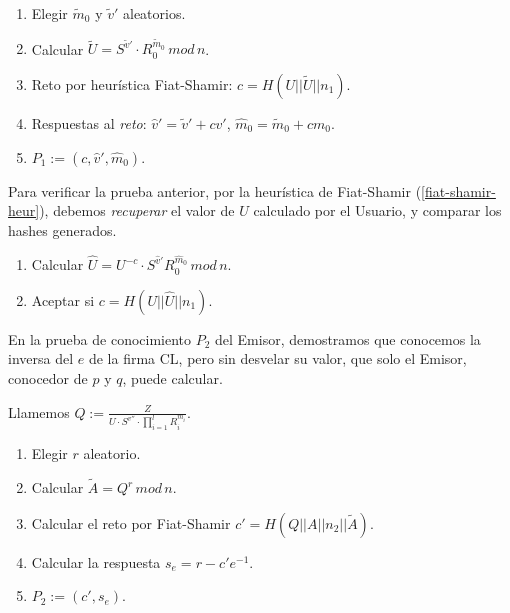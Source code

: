 \begin{algorithm}
	\hfil
	
	\begin{enumerate}
		\item Elegir $\tilde{m}_0$ y $\tilde{v}'$ aleatorios.
		\item Calcular $\tilde{U} = S^{\tilde{v}'}\cdot R_0^{\tilde{m}_0} \, mod \, n$.
		\item Reto por heurística Fiat-Shamir: $c = H(U||\tilde{U}||n_1)$.
		\item Respuestas al \textit{reto}: $\hat{v}' = \tilde{v}' + c v'$, $\hat{m}_0 = \tilde{m}_0 + c m_0$.
		\item $P_1 := (c, \hat{v}', \hat{m}_0)$.
	\end{enumerate}
	
\end{algorithm}

\hfil

Para verificar la prueba anterior, por la heurística de Fiat-Shamir (\ref{fiat-shamir-heur}), debemos \textit{recuperar} el valor de $U$ calculado por el Usuario, y comparar los hashes generados.

\begin{algorithm}[Verificar $P_1 := (c, \hat{v}', \hat{m}_0)(n_1)$]
	\hfil
	
	\begin{enumerate}
		\item Calcular $\hat{U} = U^{-c}\cdot S^{\hat{v}'} R_0^{\hat{m}_0} \, mod \, n$.
		\item Aceptar si $c = H(U||\hat{U}||n_1)$.
	\end{enumerate}
	
\end{algorithm}

\hfil


En la prueba de conocimiento $P_2$ del Emisor, demostramos que conocemos la inversa del $e$ de la firma CL, pero sin desvelar su valor, que solo el Emisor, conocedor de $p$ y $q$, puede calcular.

\begin{algorithm}[$KP\{(e^{-1}) : A \equiv \left( \frac{Z}{U\cdot S^{v''}\cdot \prod_{i=1}^{l} R_i^{m_i}} \right)^{e^{-1}} \, mod \, n \}(n_2)$]
	\hfil
	
	Llamemos $Q:=\frac{Z}{U\cdot S^{v''}\cdot \prod_{i=1}^{l} R_i^{m_i}}$.
	\begin{enumerate}
		\item Elegir $r$ aleatorio.
		\item Calcular $\tilde{A} = Q^r \, mod \, n$.
		\item Calcular el reto por Fiat-Shamir $c' = H(Q||A||n_2||\tilde{A})$.
		\item Calcular la respuesta $s_e = r-c'e^{-1}$.
		\item $P_2 := (c', s_e)$.
	\end{enumerate}
	
\end{algorithm}

